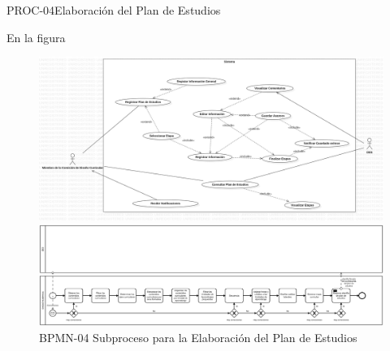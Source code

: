 \begin{BPMN}{PROC-04}{Elaboración del Plan de Estudios}{}
\end{BPMN}
En la figura \hyperref[]{}
\begin{figure}[htbp]
	\begin{center}
	\includegraphics[width=.95\textwidth]{C1-DP/SP4/Image/CasosDeUsoSP4}
		\caption{UML-04 Casos de uso para la  Elaboración del Plan de Estudios}
		\label{fig:CDU-04}
	\includegraphics[width=.95\textwidth]{C1-DP/SP4/Image/PlanDeEstudiosBPMN}
		\caption{BPMN-04 Subproceso para la  Elaboración del Plan de Estudios}
		\label{fig:BPMN-04}
	\end{center}
\end{figure}